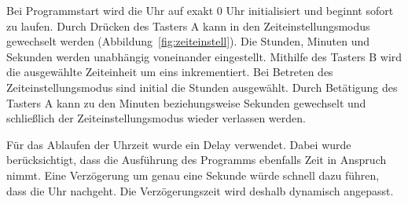 Bei Programmstart wird die Uhr auf exakt 0 Uhr initialisiert und beginnt sofort zu laufen. Durch Drücken des Tasters A kann in den Zeiteinstellungsmodus gewechselt werden  (Abbildung~\ref{fig:zeiteinstell}). Die Stunden, Minuten und Sekunden werden unabhängig voneinander eingestellt. Mithilfe des Tasters B wird die ausgewählte Zeiteinheit um eins inkrementiert. Bei Betreten des Zeiteinstellungsmodus sind initial die Stunden ausgewählt. Durch Betätigung des Tasters A kann zu den Minuten beziehungsweise Sekunden gewechselt und schließlich der Zeiteinstellungsmodus wieder verlassen werden.

Für das Ablaufen der Uhrzeit wurde ein Delay verwendet. Dabei wurde berücksichtigt, dass die Ausführung des Programms ebenfalls Zeit in Anspruch nimmt. Eine Verzögerung um genau eine Sekunde würde schnell dazu führen, dass die Uhr nachgeht. Die Verzögerungszeit wird deshalb dynamisch angepasst.
